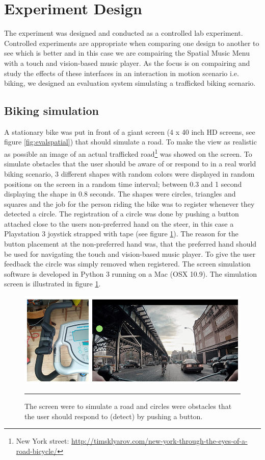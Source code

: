 \section{Experiment Design}
The experiment was designed and conducted as a controlled lab experiment. Controlled experiments are appropriate when comparing one design to another to see which is better \cite{benyon_designing_2010} and in this case we are compairing the Spatial Music Menu with a touch and vision-based music player. As the focus is on compairing and study the effects of these interfaces in an interaction in motion scenario i.e. biking, we designed an evaluation system simulating a trafficked biking scenario.

\subsection{Biking simulation}
A stationary bike was put in front of a giant screen (4 x 40 inch HD screens, see figure \ref{fig:evalspatial}) that should simulate a road. To make the view as realistic as possible an image of an actual trafficked road\footnote{New York street: \url{http://timsklyarov.com/new-york-through-the-eyes-of-a-road-bicycle/}} was showed on the screen. To simulate obstacles that the user should be aware of or respond to in a real world biking scenario, 3 different shapes with random colors were displayed in random positions on the screen in a random time interval; between 0.3 and 1 second displaying the shape in 0.8 seconds. The shapes were circles, triangles and squares and the job for the person riding the bike was to register whenever they detected a circle. The registration of a circle was done by pushing a button attached close to the users non-preferred hand on the steer, in this case a Playstation 3 joystick strapped with tape (see figure \ref{fig:simulationsystem}). The reason for the button placement at the non-preferred hand was, that the preferred hand should be used for navigating the touch and vision-based music player. To give the user feedback the circle was simply removed when registered. The screen simulation software is developed in Python 3 running on a Mac (OSX 10.9). The simulation screen is illustrated in figure \ref{fig:simulationsystem}.

\begin{figure}[h]
	\centering
		\includegraphics[width=\textwidth,height=\textheight,keepaspectratio]{./Figures/simulation_system.jpg}
		\rule{35em}{1pt}
	\caption[Simulation screen]{The screen were to simulate a road and circles were obstacles that the user should respond to (detect) by pushing a button.}
	\label{fig:simulationsystem}
\end{figure}

